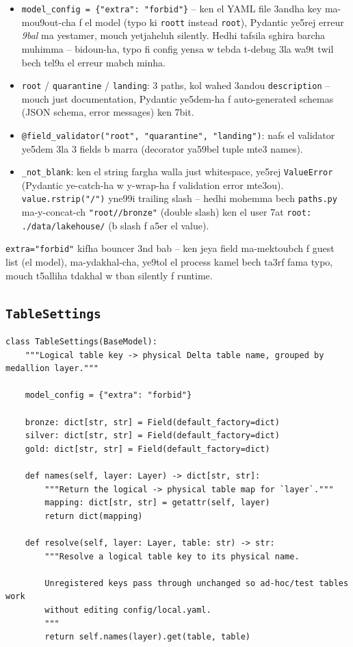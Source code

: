 \documentclass[11pt,a4paper]{report}
\DeclareRobustCommand{\code}[1]{\texttt{#1}}
\begin{document}
\begin{itemize}
  \item \code{model\_config = \{"extra": "forbid"\}} -- ken el YAML file 3andha
        key ma-mou9out-cha f el model (typo ki \code{roott} instead \code{root}),
        Pydantic ye5rej erreur \emph{9bal} ma yestamer, mouch yetjaheluh silently.
        Hedhi tafsila sghira barcha muhimma -- bidoun-ha, typo fi config yensa
        w tebda t-debug 3la wa9t twil bech tel9a el erreur mabch minha.
  \item \code{root} / \code{quarantine} / \code{landing}: 3 paths, kol wahed
        3andou \code{description} -- mouch just documentation, Pydantic ye5dem-ha
        f auto-generated schemas (JSON schema, error messages) ken 7bit.
  \item \code{@field\_validator("root", "quarantine", "landing")}: nafs el
        validator ye5dem 3la 3 fields b marra (decorator ya59bel tuple mte3
        names).
  \item \code{\_not\_blank}: ken el string fargha walla just whitespace, ye5rej
        \code{ValueError} (Pydantic ye-catch-ha w y-wrap-ha f validation error
        mte3ou). \code{value.rstrip("/")} yne99i trailing slash -- hedhi mohemma
        bech \code{paths.py} ma-y-concat-ch \code{"root//bronze"} (double slash)
        ken el user 7at \code{root: ./data/lakehouse/} (b slash f a5er el value).
\end{itemize}

\begin{analogy}
\code{extra="forbid"} kifha bouncer 3nd bab -- ken jeya field ma-mektoubch f
guest list (el model), ma-ydakhal-cha, ye9tol el process kamel bech ta3rf fama
typo, mouch t5alliha tdakhal w tban silently f runtime.
\end{analogy}

\subsection{\code{TableSettings}}

\begin{lstlisting}[style=pystyle]
class TableSettings(BaseModel):
    """Logical table key -> physical Delta table name, grouped by medallion layer."""

    model_config = {"extra": "forbid"}

    bronze: dict[str, str] = Field(default_factory=dict)
    silver: dict[str, str] = Field(default_factory=dict)
    gold: dict[str, str] = Field(default_factory=dict)

    def names(self, layer: Layer) -> dict[str, str]:
        """Return the logical -> physical table map for `layer`."""
        mapping: dict[str, str] = getattr(self, layer)
        return dict(mapping)

    def resolve(self, layer: Layer, table: str) -> str:
        """Resolve a logical table key to its physical name.

        Unregistered keys pass through unchanged so ad-hoc/test tables work
        without editing config/local.yaml.
        """
        return self.names(layer).get(table, table)
\end{lstlisting}
\end{document}
